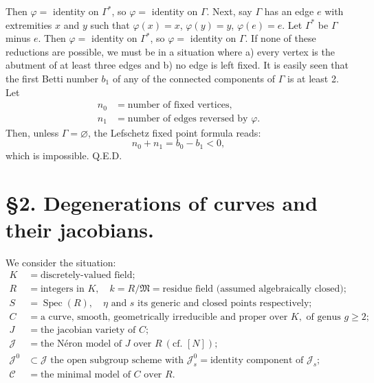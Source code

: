 \documentclass[10pt]{article}
\newcommand{\Spec}{\operatorname{Spec}}
\newcommand{\QED}{\hfill Q.E.D.}
\begin{document}
Then $\varphi=$ identity on $\Gamma^*$, so $\varphi=$ identity on $\Gamma$. Next, say $\Gamma$ has an edge $e$ with extremities $x$ and $y$ such that $\varphi(x)=x$, $\varphi(y)=y$, $\varphi(e)=e$. Let $\Gamma^*$ be $\Gamma$ minus $e$. Then $\varphi=$ identity on $\Gamma^*$, so $\varphi=$ identity on $\Gamma$. If none of these reductions are possible, we must be in a situation where a) every vertex is the abutment of at least three edges and b) no edge is left fixed. It is easily seen that the first Betti number $b_1$ of any of the connected components of $\Gamma$ is at least 2. Let
\[
\begin{aligned}
n_0&=\text{number of fixed vertices},\\
n_1&=\text{number of edges reversed by }\varphi.
\end{aligned}
\]
Then, unless $\Gamma=\varnothing$, the Lefschetz fixed point formula reads:
\[
n_0+n_1=b_0-b_1<0,
\]
which is impossible. \QED

\section*{\S 2. Degenerations of curves and their jacobians.}

We consider the situation:
\begin{align*}
K&=\text{discretely-valued field};\\
R&=\text{integers in }K,\quad k=R/\mathfrak M=\text{residue field (assumed algebraically closed)};\\
S&=\Spec(R),\quad \eta\text{ and }s\text{ its generic and closed points respectively};\\
C&=\text{a curve, smooth, geometrically irreducible and proper over }K,\text{ of genus }g\geq2;\\
J&=\text{the jacobian variety of }C;\\
\mathscr J&=\text{the N\'eron model of }J\text{ over }R\ (\text{cf. }[N]);\\
\mathscr J^0&\subset\mathscr J\text{ the open subgroup scheme with }\mathscr J_s^0=\text{identity component of }\mathscr J_s;\\
\mathscr C&=\text{the minimal model of }C\text{ over }R.
\end{align*}
\end{document}
